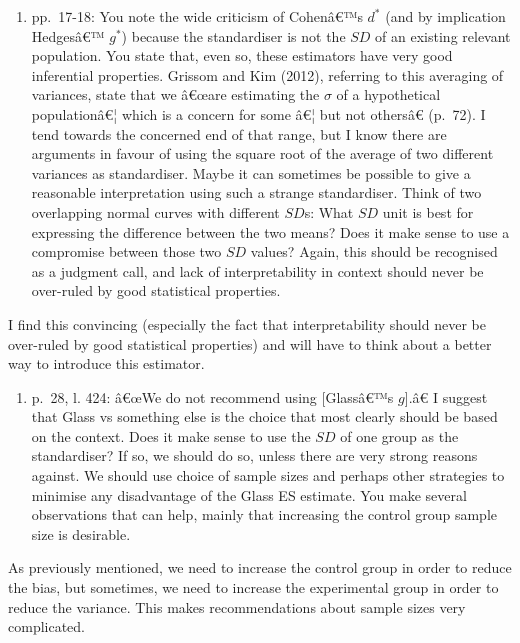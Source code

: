 \begin{appendix}
\begin{enumerate}
\def\labelenumi{\arabic{enumi}.}
\setcounter{enumi}{1}
\tightlist
\item
  pp.~17-18: You note the wide criticism of Cohenâ€™s \(d^*\) (and by
  implication Hedgesâ€™ \(g^*\)) because the standardiser is not the
  \(SD\) of an existing relevant population. You state that, even so,
  these estimators have very good inferential properties. Grissom and
  Kim (2012), referring to this averaging of variances, state that we
  â€œare estimating the \(\sigma\) of a hypothetical populationâ€¦ which
  is a concern for some â€¦ but not othersâ€ (p.~72). I tend towards
  the concerned end of that range, but I know there are arguments in
  favour of using the square root of the average of two different
  variances as standardiser. Maybe it can sometimes be possible to give
  a reasonable interpretation using such a strange standardiser. Think
  of two overlapping normal curves with different \(SD\)s: What \(SD\)
  unit is best for expressing the difference between the two means? Does
  it make sense to use a compromise between those two \(SD\) values?
  Again, this should be recognised as a judgment call, and lack of
  interpretability in context should never be over-ruled by good
  statistical properties.
\end{enumerate}

\color{blue} I find this convincing (especially the fact that
interpretability should never be over-ruled by good statistical
properties) and will have to think about a better way to introduce this
estimator.

\color{black}

\begin{enumerate}
\def\labelenumi{\arabic{enumi}.}
\tightlist
\item
  p.~28, l. 424: â€œWe do not recommend using {[}Glassâ€™s \(g\){]}.â€
  I suggest that Glass vs something else is the choice that most clearly
  should be based on the context. Does it make sense to use the \(SD\)
  of one group as the standardiser? If so, we should do so, unless there
  are very strong reasons against. We should use choice of sample sizes
  and perhaps other strategies to minimise any disadvantage of the Glass
  ES estimate. You make several observations that can help, mainly that
  increasing the control group sample size is desirable.
\end{enumerate}

\color{blue} As previously mentioned, we need to increase the control
group in order to reduce the bias, but sometimes, we need to increase
the experimental group in order to reduce the variance. This makes
recommendations about sample sizes very complicated.


\end{appendix}
